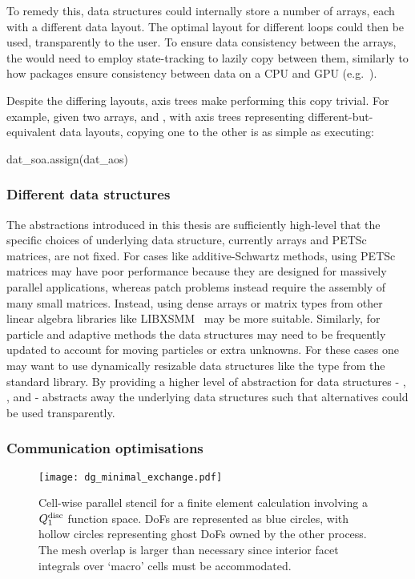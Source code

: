 \documentclass[thesis]{subfiles}
\begin{document}
To remedy this,  data structures could internally store a number of arrays, each with a different data layout.
The optimal layout for different loops could then be used, transparently to the user.
To ensure data consistency between the arrays, the  would need to employ state-tracking to lazily copy between them, similarly to how packages ensure consistency between data on a CPU and GPU (e.g.~\cite{MILLS2021102831}).

Despite the differing layouts, axis trees make performing this copy trivial.
For example, given two arrays,  and , with axis trees representing different-but-equivalent data layouts, copying one to the other is as simple as executing:
\begin{pyinline}
  dat_soa.assign(dat_aos)
\end{pyinline}

\subsubsection{Different data structures}

The abstractions introduced in this thesis are sufficiently high-level that the specific choices of underlying data structure, currently \numpy{} arrays and PETSc matrices, are not fixed.
For cases like additive-Schwartz methods, using PETSc matrices may have poor performance because they are designed for massively parallel applications, whereas patch problems instead require the assembly of many small matrices.
Instead, using dense arrays or matrix types from other linear algebra libraries like LIBXSMM~\cite{heineckeLIBXSMMAcceleratingSmall2016} may be more suitable.
Similarly, for particle and adaptive methods the data structures may need to be frequently updated to account for moving particles or extra unknowns.
For these cases one may want to use dynamically resizable data structures like the  type from the \cplusplus{} standard library.
By providing a higher level of abstraction for data structures - , , and  -  abstracts away the underlying data structures such that alternatives could be used transparently.

\subsubsection{Communication optimisations}

\begin{figure}
  \centering
  \texttt{[image: dg\_minimal\_exchange.pdf]}
  \caption{
    Cell-wise parallel stencil for a finite element calculation involving a $Q_1^{\textnormal{disc}}$ function space.
    DoFs are represented as blue circles, with hollow circles representing ghost DoFs owned by the other process.
    The mesh overlap is larger than necessary since interior facet integrals over `macro' cells must be accommodated.
  }
  \label{fig:dg_minimal_exchange}
\end{figure}
\end{document}
